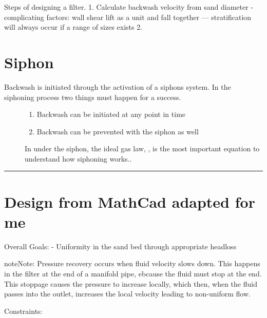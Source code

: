 \documentclass[letterpaper,10pt,english]{sphinxmanual}
\begin{document}
Steps of designing a filter.
1. Calculate backwash velocity from sand diameter
- complicating factors:
\textendash{} wall shear
\textendash{} lift as a unit and fall together
— stratification will always occur if a range of sizes exists
2.


\section{Siphon}
\label{\detokenize{Filtration/Filtration_Design:siphon}}\label{\detokenize{Filtration/Filtration_Design:id1}}\begin{description}
\item[{Backwash is initiated through the activation of a siphons system. In the siphoning process two things must happen for a success.}] \leavevmode\begin{enumerate}
\item {} 
Backwash can be initiated at any point in time

\item {} 
Backwash can be prevented with the siphon as well

\end{enumerate}

In under the siphon, the ideal gas law, , is the most important equation to understand how siphoning works..

\end{description}


\bigskip\hrule\bigskip



\section{Design from MathCad adapted for me}
\label{\detokenize{Filtration/Filtration_Design:design-from-mathcad-adapted-for-me}}
Overall Goals:
- Uniformity in the sand bed through appropriate headloss

\begin{sphinxadmonition}{note}{Note:}
Pressure recovery occurs when fluid velocity slows down. This happens in the filter at the end of a manifold pipe, ebcause the fluid must stop at the end. This stoppage causes the pressure to increase locally, which then, when the fluid passes into the outlet, increases the local velocity leading to non-uniform flow.
\end{sphinxadmonition}

Constraints:
\end{document}

